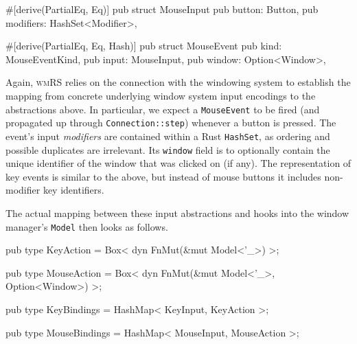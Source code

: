 \begin{rustblock}
  #[derive(PartialEq, Eq)]
  pub struct MouseInput {
    pub button: Button,
    pub modifiers: HashSet<Modifier>,
  }
\end{rustblock}

\begin{rustblock}
  #[derive(PartialEq, Eq, Hash)]
  pub struct MouseEvent {
    pub kind: MouseEventKind,
    pub input: MouseInput,
    pub window: Option<Window>,
  }
\end{rustblock}

Again,  \textsc{wmRS} relies  on the  connection  with the  windowing system  to
establish the mapping from concrete  underlying window system input encodings to
the abstractions  above. In  particular, we expect  a \texttt{MouseEvent}  to be
fired (and propagated up through \texttt{Connection::step}) whenever a button is
pressed.  The  event's input  \textit{modifiers}  are  contained within  a  Rust
\texttt{HashSet},  as  ordering  and  possible duplicates  are  irrelevant.  Its
\texttt{window}  field is  to optionally  contain the  unique identifier  of the
window that was clicked on (if any). The representation of key events is similar
to  the  above, but  instead  of  mouse  buttons  it includes  non-modifier  key
identifiers.

The actual  mapping between these input  abstractions and hooks into  the window
manager's \texttt{Model} then looks as follows.

\begin{rustblock}
  pub type KeyAction = Box<
    dyn FnMut(&mut Model<'_>)
  >;
\end{rustblock}
\begin{rustblock}
  pub type MouseAction = Box<
    dyn FnMut(&mut Model<'_>, Option<Window>)
  >;
\end{rustblock}
\begin{rustblock}
  pub type KeyBindings = HashMap<
    KeyInput, KeyAction
  >;
\end{rustblock}
\begin{rustblock}
  pub type MouseBindings = HashMap<
    MouseInput, MouseAction
  >;
\end{rustblock}

